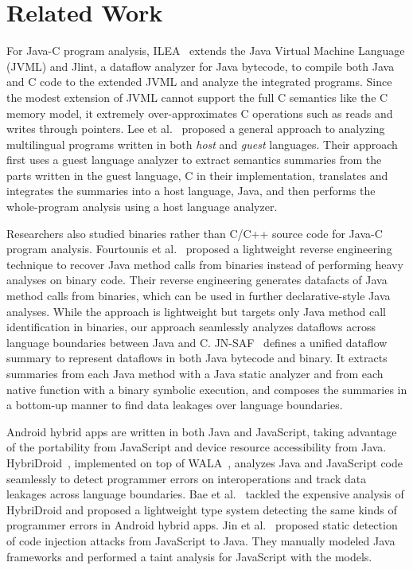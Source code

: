 \section{Related Work}\label{sec:related}
For Java-C program analysis, ILEA~\cite{ILEA} extends
the Java Virtual Machine Language (JVML) and Jlint, a dataflow analyzer for
Java bytecode, to compile both Java and C code to the extended JVML and analyze
the integrated programs.  Since the modest extension of JVML cannot
support the full C semantics like the C memory model, it extremely over-approximates C
operations such as reads and writes through pointers.  Lee et al.~\cite{LeeASE20}
proposed a general approach to analyzing multilingual programs written in both
{\it host} and {\it guest} languages.  Their approach first uses a guest
language analyzer to extract semantics summaries from the parts written in the
guest language, C in their implementation, translates and integrates the
summaries into a host language, Java, and then performs the whole-program
analysis using a host language analyzer. 

Researchers also studied binaries rather than C/C++ source code
for Java-C program analysis. Fourtounis et al.~\cite{scanning} proposed a lightweight reverse engineering technique to
recover Java method calls from binaries instead of performing heavy analyses on
binary code.  Their reverse engineering generates datafacts of Java method
calls from binaries, which can be used in further declarative-style Java
analyses. While the approach is lightweight but targets only Java method call
identification in binaries, our approach seamlessly analyzes dataflows across language
boundaries between Java and C.  JN-SAF~\cite{JN-SAF} defines a
unified dataflow summary to represent dataflows in both Java bytecode and
binary.  It extracts summaries from each Java method with a Java static
analyzer and from each native function with a binary symbolic execution, and
composes the summaries in a bottom-up manner to find data leakages over
language boundaries.

Android hybrid apps are
written in both Java and JavaScript, taking advantage of the portability from
JavaScript and device resource accessibility from Java.
HybriDroid~\cite{hybridroid}, implemented on top of WALA~\cite{WALA}, analyzes
Java and JavaScript code seamlessly to detect programmer errors on
interoperations and track data leakages across language boundaries.
Bae et al.~\cite{BaeICSE19} tackled the expensive analysis of HybriDroid and proposed
a lightweight type system detecting the same kinds of programmer errors in
Android hybrid apps. Jin et al.~\cite{jin2014code} proposed static detection
of code injection attacks from JavaScript to Java.  They manually
modeled Java frameworks and performed a taint analysis for JavaScript with the models.


